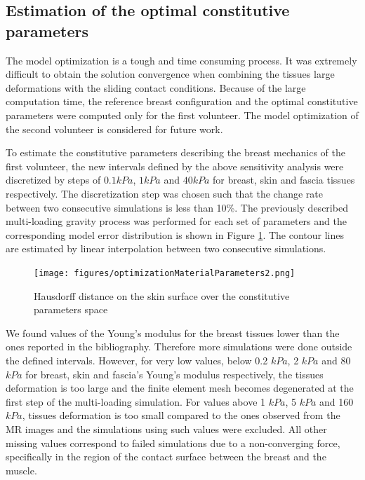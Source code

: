 \subsection{Estimation of the optimal constitutive parameters}

The model optimization is a tough and time consuming process. It was extremely difficult to obtain the solution convergence when combining the tissues large deformations with the sliding contact conditions. Because of the large computation time, the reference breast configuration and the optimal constitutive parameters were computed only for the first volunteer. The model optimization of the second volunteer is considered for future work.

To estimate the constitutive parameters describing the breast mechanics of the first volunteer, the new intervals defined by the above sensitivity analysis were discretized by steps of $0.1 kPa$, $1kPa$ and $40 kPa$ for breast, skin and fascia tissues respectively. The discretization step was chosen such that the change rate between two consecutive simulations is less than 10\%. The previously described multi-loading gravity process was performed for each set of parameters and the corresponding model error distribution is shown in  Figure \ref{fig:optimizationresults}. The contour lines are estimated by linear interpolation between two consecutive simulations.

\begin{figure}[!h]
\centering
\texttt{[image: figures/optimizationMaterialParameters2.png]} 
\caption{Hausdorff distance on the skin surface over the constitutive parameters space}\label{fig:optimizationresults}
\end{figure}

We found values of the Young's modulus for the breast tissues  lower than the ones reported in the bibliography. Therefore more simulations were done outside the defined intervals. However, for very low values, below 0.2 $kPa$, 2 $kPa$ and 80 $kPa$ for breast, skin and fascia's Young's modulus respectively, the tissues deformation is too large and the finite element mesh becomes degenerated at the first step of the multi-loading simulation. For values above 1 $kPa$, 5 $kPa$ and 160 $kPa$, tissues deformation is too small compared to the ones observed from the MR images and the simulations using such values were excluded. All other missing values correspond to failed simulations due to a non-converging force, specifically in the region of the contact surface between the breast and the muscle.

